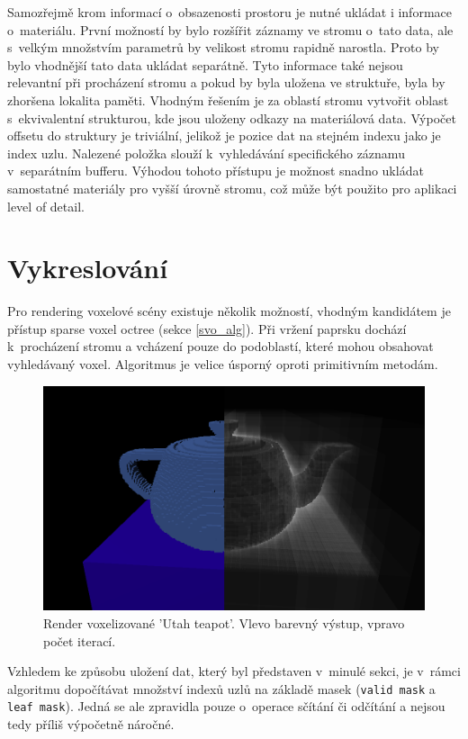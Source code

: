 Samozřejmě krom informací o~obsazenosti prostoru je nutné ukládat i informace o~materiálu. První možností by bylo rozšířit záznamy ve stromu o~tato data, ale s~velkým množstvím parametrů by velikost stromu rapidně narostla. Proto by bylo vhodnější tato data ukládat separátně. Tyto informace také nejsou relevantní při procházení stromu a pokud by byla uložena ve struktuře, byla by zhoršena lokalita paměti. Vhodným řešením je za oblastí stromu vytvořit oblast s~ekvivalentní strukturou, kde jsou uloženy odkazy na materiálová data. Výpočet offsetu do struktury je triviální, jelikož je pozice dat na stejném indexu jako je index uzlu. Nalezené položka slouží k~vyhledávání specifického záznamu v~separátním bufferu. Výhodou tohoto přístupu je možnost snadno ukládat samostatné materiály pro vyšší úrovně stromu, což může být použito pro aplikaci level of detail.

\section{Vykreslování}
Pro rendering voxelové scény existuje několik možností, vhodným kandidátem je přístup sparse voxel octree (sekce \ref{svo_alg}). Při vržení paprsku dochází k~procházení stromu a vcházení pouze do podoblastí, které mohou obsahovat vyhledávaný voxel. Algoritmus je velice úsporný oproti primitivním metodám.

\begin{figure}[H]
	\centering
	\includegraphics[scale=1]{obrazky-figures/color_iter_svo.png}
	\caption{Render voxelizované 'Utah teapot'. Vlevo barevný výstup, vpravo počet iterací. }
	\label{fig:octree_child}
\end{figure}

Vzhledem ke způsobu uložení dat, který byl představen v~minulé sekci, je v~rámci algoritmu dopočítávat množství indexů uzlů na základě masek (\texttt{valid mask} a \texttt{leaf mask}). Jedná se ale zpravidla pouze o~operace sčítání či odčítání a nejsou tedy příliš výpočetně náročné.

